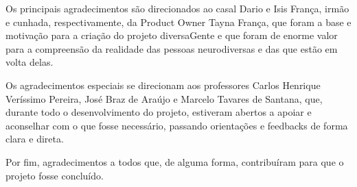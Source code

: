 \begin{agradecimentos}
Os principais agradecimentos são direcionados ao casal Dario e Isis França, irmão e cunhada, respectivamente, da Product Owner Tayna França, que foram a base e motivação para a criação do projeto diversaGente e que foram de enorme valor para a compreensão da realidade das pessoas neurodiversas e das que estão em volta delas.

Os agradecimentos especiais se direcionam aos professores Carlos Henrique Veríssimo Pereira, José Braz de Araújo e Marcelo Tavares de Santana, que, durante todo o desenvolvimento do projeto, estiveram abertos a apoiar e aconselhar com o que fosse necessário, passando orientações e feedbacks de forma clara e direta.

Por fim, agradecimentos a todos que, de alguma forma, contribuíram para que o projeto fosse concluído.

\end{agradecimentos}
